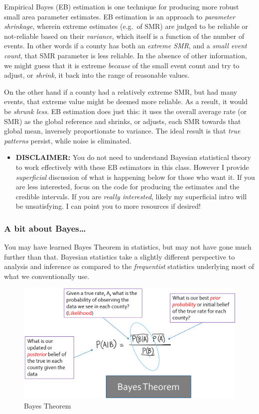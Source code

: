 \documentclass[
]{book}
\newenvironment{rmdblock}[1]
  {%
  \begin{itemize}
  \renewcommand{\labelitemi}{
    \raisebox{-.7\height}[0pt][0pt]{
      {\setkeys{Gin}{width=3em,keepaspectratio}\texttt{[image: images/\#1]}}
    }
  }
  \item
  }
  {
  \end{itemize}
  }
\newenvironment{rmdcaution}
  {\begin{rmdblock}{caution}}
  {\end{rmdblock}}
\begin{document}
Empirical Bayes (EB) estimation is one technique for producing more robust small area parameter estimates. EB estimation is an approach to \emph{parameter shrinkage}, wherein extreme estimates (e.g.~of SMR) are judged to be reliable or not-reliable based on their \emph{variance}, which itself is a function of the number of events. In other words if a county has both an \emph{extreme SMR}, and a \emph{small event count}, that SMR parameter is less reliable. In the absence of other information, we might guess that it is extreme \emph{because} of the small event count and try to adjust, or \emph{shrink}, it back into the range of reasonable values.

On the other hand if a county had a relatively extreme SMR, but had many events, that extreme value might be deemed more reliable. As a result, it would be \emph{shrunk less}. EB estimation does just this: it uses the overall average rate (or SMR) as the global reference and shrinks, or adjusts, each SMR towards that global mean, inversely proportionate to variance. The ideal result is that \emph{true patterns} persist, while noise is eliminated.

\begin{rmdcaution}
\textbf{DISCLAIMER:} You do not need to understand Bayesian statistical theory to work effectively with these EB estimators in this class. However I provide \emph{superficial} discussion of what is happening below for those who want it. If you are less interested, focus on the code for producing the estimates and the credible intervals. If you are \emph{really interested}, likely my superficial intro will be unsatisfying. I can point you to more resources if desired!
\end{rmdcaution}

\hypertarget{a-bit-about-bayes}{%
\subsubsection{A bit about Bayes\ldots{}}\label{a-bit-about-bayes}}

You may have learned Bayes Theorem in statistics, but may not have gone much further than that. Bayesian statistics take a slightly different perspective to analysis and inference as compared to the \emph{frequentist} statistics underlying most of what we conventionally use.

\begin{figure}
\centering
\includegraphics{images/bayes.png}
\caption{\label{fig:unnamed-chunk-87}Bayes Theorem}
\end{figure}
\end{document}
